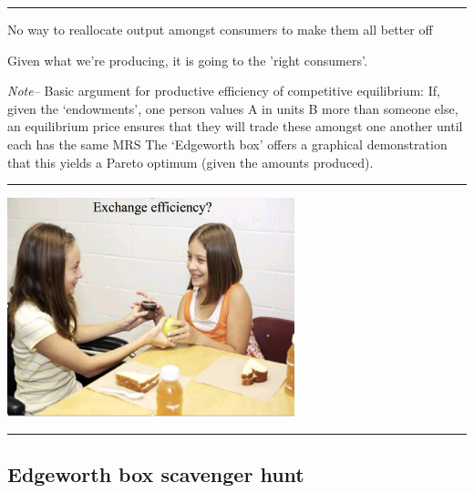 \documentclass[]{article}
\providecommand{\tightlist}{%
  \setlength{\itemsep}{0pt}\setlength{\parskip}{0pt}}
\begin{document}
\begin{center}\rule{0.5\linewidth}{\linethickness}\end{center}

\begin{description}
\tightlist
\item[Efficiency in consumption (exchange efficiency)]
No way to reallocate output amongst consumers to make them all better
off
\end{description}

\bigskip

\bigskip

\begin{centering}

Given what we're producing, it is going to the 'right consumers'.

\end{centering}

\emph{Note--} Basic argument for productive efficiency of competitive
equilibrium: If, given the `endowments', one person values A in units B
more than someone else, an equilibrium price ensures that they will
trade these amongst one another until each has the same MRS The
`Edgeworth box' offers a graphical demonstration that this yields a
Pareto optimum (given the amounts produced).

\begin{center}\rule{0.5\linewidth}{\linethickness}\end{center}

\includegraphics[height=2.5in]{picsfigs/exchange_efcy.png}

\begin{center}\rule{0.5\linewidth}{\linethickness}\end{center}

\hypertarget{edgeworth-box-scavenger-hunt}{%
\subsection{Edgeworth box scavenger
hunt}\label{edgeworth-box-scavenger-hunt}}
\end{document}

